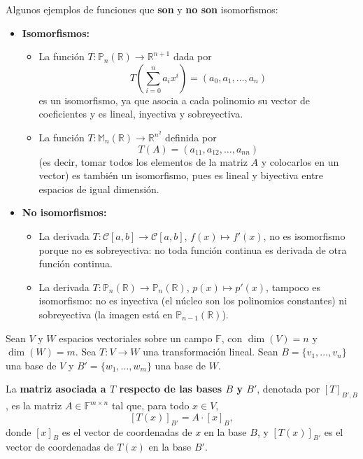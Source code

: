 \begin{example}
Algunos ejemplos de funciones que \textbf{son} y \textbf{no son} isomorfismos:

\begin{itemize}
    \item \textbf{Isomorfismos:}
    \begin{itemize}
        \item La función $T: \mathbb{P}_n(\mathbb{R}) \to \mathbb{R}^{n+1}$ dada por
        \[
        T\left(\sum_{i=0}^{n} a_i x^i\right) = (a_0, a_1, \ldots, a_n)
        \]
        es un isomorfismo, ya que asocia a cada polinomio su vector de coeficientes y es lineal, inyectiva y sobreyectiva.

        \item La función $T: \mathbb{M}_n(\mathbb{R}) \to \mathbb{R}^{n^2}$ definida por
        \[
        T(A) = (a_{11}, a_{12}, \ldots, a_{nn})
        \]
        (es decir, tomar todos los elementos de la matriz $A$ y colocarlos en un vector) es también un isomorfismo, pues es lineal y biyectiva entre espacios de igual dimensión.
    \end{itemize}

    \item \textbf{No isomorfismos:}
    \begin{itemize}
        \item La derivada $T: \mathcal{C}[a,b] \to \mathcal{C}[a,b]$, $f(x) \mapsto f'(x)$, no es isomorfismo porque no es sobreyectiva: no toda función continua es derivada de otra función continua.

        \item La derivada $T: \mathbb{P}_n(\mathbb{R}) \to \mathbb{P}_n(\mathbb{R})$, $p(x) \mapsto p'(x)$, tampoco es isomorfismo: no es inyectiva (el núcleo son los polinomios constantes) ni sobreyectiva (la imagen está en $\mathbb{P}_{n-1}(\mathbb{R})$).
    \end{itemize}
\end{itemize}
\end{example}

\begin{definition}
Sean $V$ y $W$ espacios vectoriales sobre un campo $\mathbb{F}$, con $\dim(V) = n$ y $\dim(W) = m$. Sea $T: V \to W$ una transformación lineal. Sean $B = \{v_1, \ldots, v_n\}$ una base de $V$ y $B' = \{w_1, \ldots, w_m\}$ una base de $W$.

La \textbf{matriz asociada a $T$ respecto de las bases $B$ y $B'$}, denotada por $[T]_{B', B}$, es la matriz $A \in \mathbb{F}^{m \times n}$ tal que, para todo $x \in V$,
\[
[T(x)]_{B'} = A \cdot [x]_B,
\]
donde $[x]_B$ es el vector de coordenadas de $x$ en la base $B$, y $[T(x)]_{B'}$ es el vector de coordenadas de $T(x)$ en la base $B'$.
\end{definition}

